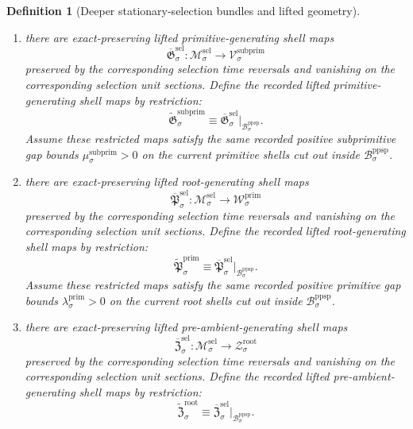 \documentclass[11pt]{article}
\newcommand{\RootTarget}[1]{\mathcal Z_{#1}^{\mathrm{root}}}
\newcommand{\PrimTarget}[1]{\mathcal W_{#1}^{\mathrm{prim}}}
\newcommand{\PrimGap}[1]{\lambda_{#1}^{\mathrm{prim}}}
\newcommand{\SubprimTarget}[1]{\mathcal V_{#1}^{\mathrm{subprim}}}
\newcommand{\SubprimGap}[1]{\mu_{#1}^{\mathrm{subprim}}}
\newcommand{\ProtoSubprimGap}[1]{\nu_{#1}^{\mathrm{psp}}}
\newcommand{\PreProtoSubprimSpace}[1]{\mathcal B_{#1}^{\mathrm{ppsp}}}
\newcommand{\PreProtoSubprimLiftedPrimitive}[1]{\widetilde{\mathfrak G}_{#1}^{\mathrm{subprim}}}
\newcommand{\PreProtoSubprimLiftedRoot}[1]{\widetilde{\mathfrak P}_{#1}^{\mathrm{prim}}}
\newcommand{\PreProtoSubprimLiftedPreAmbient}[1]{\widetilde{\mathfrak Z}_{#1}^{\mathrm{root}}}
\newcommand{\SelSpace}[1]{\mathcal M_{#1}^{\mathrm{sel}}}
\newcommand{\SelLiftedPrimitive}[1]{\overline{\mathfrak G}_{#1}^{\mathrm{sel}}}
\newcommand{\SelLiftedRoot}[1]{\overline{\mathfrak P}_{#1}^{\mathrm{sel}}}
\newcommand{\SelLiftedPreAmbient}[1]{\overline{\mathfrak Z}_{#1}^{\mathrm{sel}}}
\newtheorem{definition}{Definition}
\begin{document}
\begin{definition}[Deeper stationary-selection bundles and lifted geometry]
\begin{enumerate}
\begin{equation}
    \label{eq:preproto_subprimitive_from_selection}
    \end{equation}
    Assume these restricted maps satisfy the same recorded positive proto-subprimitive gap bounds \(\ProtoSubprimGap{\sigma}>0\) on the current subprimitive shells cut out inside \(\PreProtoSubprimSpace{\sigma}\).
    \item there are exact-preserving lifted primitive-generating shell maps
    \[
    \SelLiftedPrimitive{\sigma}:\SelSpace{\sigma}\to\SubprimTarget{\sigma}
    \]
    preserved by the corresponding selection time reversals and vanishing on the corresponding selection unit sections. Define the recorded lifted primitive-generating shell maps by restriction:
    \begin{equation}
    \PreProtoSubprimLiftedPrimitive{\sigma}\equiv \SelLiftedPrimitive{\sigma}|_{\PreProtoSubprimSpace{\sigma}}.
    \label{eq:preproto_primitive_from_selection}
    \end{equation}
    Assume these restricted maps satisfy the same recorded positive subprimitive gap bounds \(\SubprimGap{\sigma}>0\) on the current primitive shells cut out inside \(\PreProtoSubprimSpace{\sigma}\).
    \item there are exact-preserving lifted root-generating shell maps
    \[
    \SelLiftedRoot{\sigma}:\SelSpace{\sigma}\to\PrimTarget{\sigma}
    \]
    preserved by the corresponding selection time reversals and vanishing on the corresponding selection unit sections. Define the recorded lifted root-generating shell maps by restriction:
    \begin{equation}
    \PreProtoSubprimLiftedRoot{\sigma}\equiv \SelLiftedRoot{\sigma}|_{\PreProtoSubprimSpace{\sigma}}.
    \label{eq:preproto_root_from_selection}
    \end{equation}
    Assume these restricted maps satisfy the same recorded positive primitive gap bounds \(\PrimGap{\sigma}>0\) on the current root shells cut out inside \(\PreProtoSubprimSpace{\sigma}\).
    \item there are exact-preserving lifted pre-ambient-generating shell maps
    \[
    \SelLiftedPreAmbient{\sigma}:\SelSpace{\sigma}\to\RootTarget{\sigma}
    \]
    preserved by the corresponding selection time reversals and vanishing on the corresponding selection unit sections. Define the recorded lifted pre-ambient-generating shell maps by restriction:
    \begin{equation}
    \PreProtoSubprimLiftedPreAmbient{\sigma}\equiv \SelLiftedPreAmbient{\sigma}|_{\PreProtoSubprimSpace{\sigma}}.

\end{equation}
\end{enumerate}
\end{definition}
\end{document}

